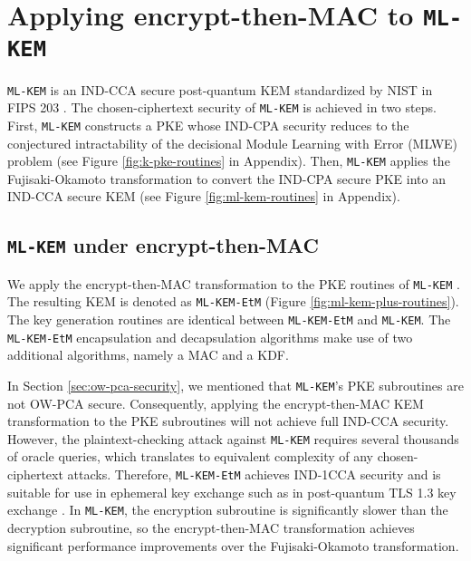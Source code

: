 \documentclass[runningheads]{llncs}
\begin{document}
\section{Applying encrypt-then-MAC to \texttt{ML-KEM}}\label{sec:applying-encrypt-then-mac-to-ml-kem}
\texttt{ML-KEM} is an IND-CCA secure post-quantum KEM standardized by NIST in FIPS 203 \cite{FIPS203}. The chosen-ciphertext security of \texttt{ML-KEM} is achieved in two steps. First, \texttt{ML-KEM} constructs a PKE whose IND-CPA security reduces to the conjectured intractability of the decisional Module Learning with Error (MLWE) problem \cite{DBLP:conf/stoc/Regev05,DBLP:conf/eurocrypt/LyubashevskyPR10,DBLP:journals/jacm/Regev09,DBLP:conf/stoc/Peikert09} (see Figure \ref{fig:k-pke-routines} in Appendix). Then, \texttt{ML-KEM} applies the Fujisaki-Okamoto transformation to convert the IND-CPA secure PKE into an IND-CCA secure KEM (see Figure \ref{fig:ml-kem-routines} in Appendix).

\subsection{\texttt{ML-KEM} under encrypt-then-MAC}
We apply the encrypt-then-MAC transformation to the PKE routines of \texttt{ML-KEM} \cite{FIPS203}. The resulting KEM is denoted as \texttt{ML-KEM-EtM} (Figure \ref{fig:ml-kem-plus-routines}). The key generation routines are identical between \texttt{ML-KEM-EtM} and \texttt{ML-KEM}. The \texttt{ML-KEM-EtM} encapsulation and decapsulation algorithms make use of two additional algorithms, namely a {\sf MAC} and a {\sf KDF}.

In Section \ref{sec:ow-pca-security}, we mentioned that \texttt{ML-KEM}'s PKE subroutines are not OW-PCA secure. Consequently, applying the encrypt-then-MAC KEM transformation to the PKE subroutines will not achieve full IND-CCA security. However, the plaintext-checking attack against \texttt{ML-KEM} requires several thousands of oracle queries, which translates to equivalent complexity of any chosen-ciphertext attacks. Therefore, \texttt{ML-KEM-EtM} achieves IND-1CCA security and is suitable for use in ephemeral key exchange such as in post-quantum TLS 1.3 key exchange \cite{DBLP:conf/ccs/SchwabeSW20,DBLP:conf/eurocrypt/Huguenin-Dumittan22,DBLP:conf/asiacrypt/ZhouJZ24,DBLP:conf/asiacrypt/JiangMZ23}. In \texttt{ML-KEM}, the encryption subroutine is significantly slower than the decryption subroutine, so the encrypt-then-MAC transformation achieves significant performance improvements over the Fujisaki-Okamoto transformation.
\end{document}

